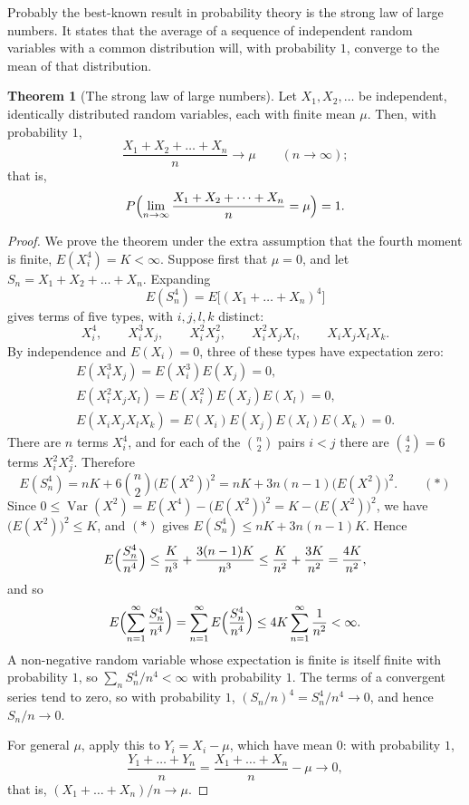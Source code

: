 \documentclass[11pt,a4paper]{article}
\theoremstyle{definition}
\newtheorem{thm}{Theorem}[subsection]
\DeclareMathOperator{\Var}{Var}
\begin{document}
Probably the best-known result in probability theory is the strong law of large numbers. It states that the average of a
sequence of independent random variables with a common distribution will, with probability $1$, converge to the mean of
that distribution.

\begin{thm}[The strong law of large numbers]\label{thm:slln}
Let $X_1, X_2, \dots$ be independent, identically distributed random variables, each with finite mean $\mu$. Then, with probability $1$,
\[
\frac{X_1 + X_2 + \dots + X_n}{n} \to \mu \qquad (n \to \infty) ;
\]
that is,
\[
P\Bigl(\lim_{n\to\infty}\frac{X_1 + X_2 + \dots + X_n}{n} = \mu\Bigr) = 1 .
\]
\end{thm}

\begin{proof}
We prove the theorem under the extra assumption that the fourth moment is finite, $E(X_i^4) = K < \infty$. Suppose first that $\mu = 0$, and let
$S_n = X_1 + X_2 + \dots + X_n$. Expanding
\[
E(S_n^4) = E\bigl[(X_1 + \dots + X_n)^4\bigr]
\]
gives terms of five types, with $i, j, l, k$ distinct:
\[
X_i^4 , \qquad X_i^3X_j , \qquad X_i^2X_j^2 , \qquad X_i^2X_jX_l , \qquad X_iX_jX_lX_k .
\]
By independence and $E(X_i) = 0$, three of these types have expectation zero:
\begin{gather*}
E(X_i^3X_j) = E(X_i^3)E(X_j) = 0 , \\
E(X_i^2X_jX_l) = E(X_i^2)E(X_j)E(X_l) = 0 , \\
E(X_iX_jX_lX_k) = E(X_i)E(X_j)E(X_l)E(X_k) = 0 .
\end{gather*}
There are $n$ terms $X_i^4$, and for each of the $\binom n2$ pairs $i < j$ there are $\binom42 = 6$ terms $X_i^2X_j^2$. Therefore
\[
E(S_n^4) = nK + 6\binom n2\bigl(E(X^2)\bigr)^2 = nK + 3n(n - 1)\bigl(E(X^2)\bigr)^2 . \qquad (*)
\]
Since $0 \le \Var(X^2) = E(X^4) - \bigl(E(X^2)\bigr)^2 = K - \bigl(E(X^2)\bigr)^2$, we have $\bigl(E(X^2)\bigr)^2 \le K$, and $(*)$ gives $E(S_n^4) \le nK + 3n(n - 1)K$. Hence
\[
E\Bigl(\frac{S_n^4}{n^4}\Bigr) \le \frac{K}{n^3} + \frac{3(n - 1)K}{n^3} \le \frac{K}{n^2} + \frac{3K}{n^2} = \frac{4K}{n^2} ,
\]
and so
\[
E\Bigl(\sum_{n=1}^\infty\frac{S_n^4}{n^4}\Bigr) = \sum_{n=1}^\infty E\Bigl(\frac{S_n^4}{n^4}\Bigr) \le 4K\sum_{n=1}^\infty\frac{1}{n^2} < \infty .
\]
A non-negative random variable whose expectation is finite is itself finite with probability $1$, so $\sum_n S_n^4/n^4 < \infty$ with probability $1$. The terms of a convergent
series tend to zero, so with probability $1$, $(S_n/n)^4 = S_n^4/n^4 \to 0$, and hence $S_n/n \to 0$.

For general $\mu$, apply this to $Y_i = X_i - \mu$, which have mean $0$: with probability $1$,
\[
\frac{Y_1 + \dots + Y_n}{n} = \frac{X_1 + \dots + X_n}{n} - \mu \to 0 ,
\]
that is, $(X_1 + \dots + X_n)/n \to \mu$.
\end{proof}
\end{document}
